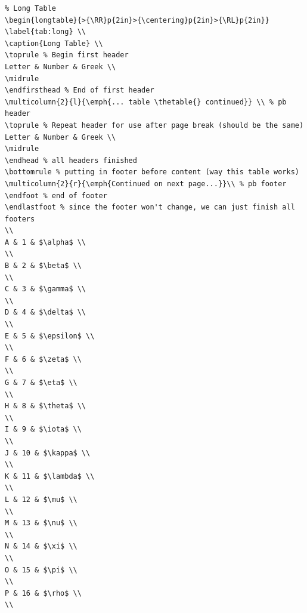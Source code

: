 \documentclass[12pt]{article}
\newcommand{\RR}{\raggedright\arraybackslash} %
\newcommand{\RL}{\raggedleft\arraybackslash} %
\begin{document}
\begin{verbatim}
% Long Table
\begin{longtable}{>{\RR}p{2in}>{\centering}p{2in}>{\RL}p{2in}}
\label{tab:long} \\
\caption{Long Table} \\
\toprule % Begin first header
Letter & Number & Greek \\
\midrule
\endfirsthead % End of first header
\multicolumn{2}{l}{\emph{... table \thetable{} continued}} \\ % pb header
\toprule % Repeat header for use after page break (should be the same)
Letter & Number & Greek \\
\midrule
\endhead % all headers finished
\bottomrule % putting in footer before content (way this table works)
\multicolumn{2}{r}{\emph{Continued on next page...}}\\ % pb footer
\endfoot % end of footer
\endlastfoot % since the footer won't change, we can just finish all footers
\\
A & 1 & $\alpha$ \\
\\
B & 2 & $\beta$ \\
\\
C & 3 & $\gamma$ \\
\\
D & 4 & $\delta$ \\
\\
E & 5 & $\epsilon$ \\
\\
F & 6 & $\zeta$ \\
\\
G & 7 & $\eta$ \\
\\
H & 8 & $\theta$ \\
\\
I & 9 & $\iota$ \\
\\
J & 10 & $\kappa$ \\
\\
K & 11 & $\lambda$ \\
\\
L & 12 & $\mu$ \\
\\
M & 13 & $\nu$ \\
\\
N & 14 & $\xi$ \\
\\
O & 15 & $\pi$ \\
\\
P & 16 & $\rho$ \\
\\

\end{verbatim}
\end{document}
